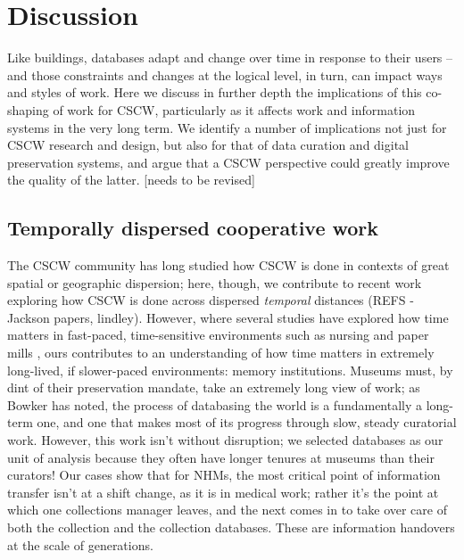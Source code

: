 \section{Discussion}

Like buildings, databases adapt and change over time in response to their users -- and those constraints and changes at the logical level, in turn, can impact ways and styles of work.  Here we discuss in further depth the implications of this co-shaping of work for CSCW, particularly as it affects work and information systems in the very long term. We identify a number of implications not just for CSCW research and design, but also for that of data curation and digital preservation systems, and argue that a CSCW perspective could greatly improve the quality of the latter. [needs to be revised]

\subsection{Temporally dispersed cooperative work}

The CSCW community has long studied how CSCW is done in contexts of great spatial or geographic dispersion; here, though, we contribute to recent work exploring how CSCW is done across dispersed \textit{temporal} distances (REFS - Jackson papers, lindley). However, where several studies have explored how time matters in fast-paced, time-sensitive environments such as nursing \cite{sarcevic2009information, Reddy_2006}  and paper mills \cite{auramaki1996paperwork}, ours contributes to an understanding of how time matters in extremely long-lived, if slower-paced environments: memory institutions. Museums must, by dint of their preservation mandate, take an extremely long view of work; as Bowker has noted, the process of databasing the world is a fundamentally a long-term one, and one that makes most of its progress through slow, steady curatorial work. However, this work isn't without disruption; we selected databases as our unit of analysis because they often have longer tenures at museums than their curators! Our cases show that for NHMs, the most critical point of information transfer isn't at a shift change, as it is in medical work; rather it's the point at which one collections manager leaves, and the next comes in to take over care of both the collection and the collection databases. These are information handovers at the scale of generations.

